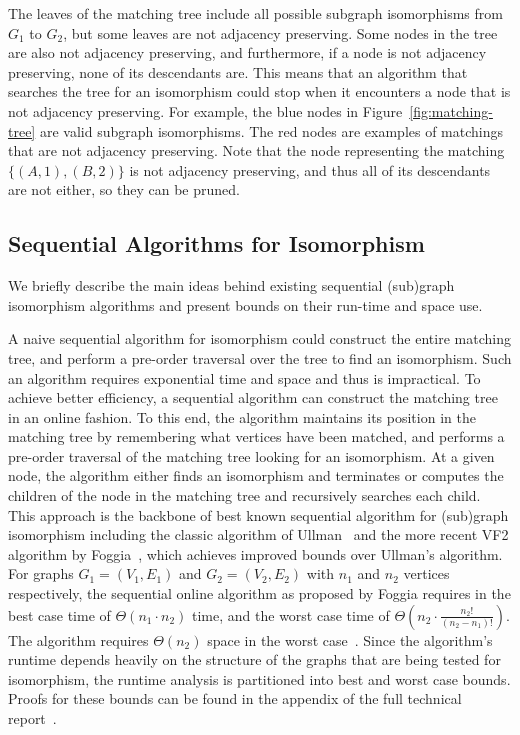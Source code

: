 The leaves of the matching tree include all possible subgraph
isomorphisms from $G_1$ to $G_2$, but some leaves are not adjacency
preserving.
%
Some nodes in the tree are also not adjacency preserving, and
furthermore, if a node is not adjacency preserving, none of its
descendants are.
%
This means that an algorithm that searches the tree for an %
isomorphism could stop when it encounters a node that is not
adjacency preserving.
%
For example, the blue nodes in Figure~\ref{fig:matching-tree} are
valid subgraph isomorphisms.
%
The red nodes are examples of matchings that are not adjacency
preserving.
%
Note that the node representing the matching $\{(A,1), (B,2)\}$ is not
adjacency preserving, and thus all of its descendants are not either,
so they can be pruned. %

\subsection{Sequential Algorithms for Isomorphism}\label{background::sequential}


We briefly describe the main ideas behind existing sequential
(sub)graph isomorphism algorithms and present bounds on their run-time
and space use.


A naive sequential algorithm for isomorphism could construct the
entire matching tree, and perform a pre-order traversal over the tree
to find an isomorphism. Such an algorithm requires exponential time
and space and thus is impractical.
%
To achieve better efficiency, a sequential algorithm can construct the
matching tree in an online fashion.
%
To this end, the algorithm maintains its position in the matching tree
by remembering what vertices have been matched, and performs a
pre-order traversal of the matching tree looking for an isomorphism.
%
At a given node, the algorithm either finds an isomorphism and
terminates or computes the children of the node in the matching tree
and recursively searches each child.
%
This approach is the backbone of best known sequential algorithm for
(sub)graph isomorphism including the classic algorithm of
Ullman~\cite{ullman} and the more recent VF2 algorithm by
Foggia~\cite{VF2}, which achieves improved bounds over Ullman's
algorithm.
%
For graphs $G_1 = (V_1, E_1)$ and $G_2 = (V_2, E_2)$ with $n_1$ and
$n_2$ vertices respectively, the sequential online algorithm as
proposed by Foggia requires in the best case time of $\Theta(n_1 \cdot
n_2)$ time, and the worst case time of $\Theta\left(n_2 \cdot
\frac{n_2!}{(n_2-n_1)!} \right)$.
%
The algorithm requires $\Theta(n_2)$ space in the worst
case~\cite{VF2}.
%
Since the algorithm's runtime depends heavily on the structure
of the graphs that are being tested for isomorphism,
the runtime analysis is partitioned into best and
worst case bounds.
%
Proofs for these bounds can be found in
the appendix of the full technical report~\cite{YA-iso-18}.

